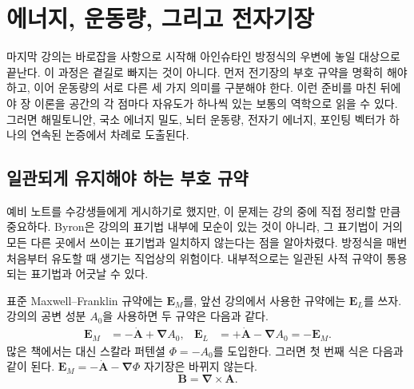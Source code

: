 \chapter{에너지, 운동량, 그리고 전자기장}

마지막 강의는 바로잡을 사항으로 시작해 아인슈타인 방정식의 우변에 놓일 대상으로 끝난다. 이 과정은 곁길로 빠지는 것이 아니다. 먼저 전기장의 부호 규약을 명확히 해야 하고, 이어 운동량의 서로 다른 세 가지 의미를 구분해야 한다. 이런 준비를 마친 뒤에야 장 이론을 공간의 각 점마다 자유도가 하나씩 있는 보통의 역학으로 읽을 수 있다. 그러면 해밀토니안, 국소 에너지 밀도, 뇌터 운동량, 전자기 에너지, 포인팅 벡터가 하나의 연속된 논증에서 차례로 도출된다.

\section{일관되게 유지해야 하는 부호 규약}

예비 노트를 수강생들에게 게시하기로 했지만, 이 문제는 강의 중에 직접 정리할 만큼 중요하다. Byron은 강의의 표기법 내부에 모순이 있는 것이 아니라, 그 표기법이 거의 모든 다른 곳에서 쓰이는 표기법과 일치하지 않는다는 점을 알아차렸다. 방정식을 매번 처음부터 유도할 때 생기는 직업상의 위험이다. 내부적으로는 일관된 사적 규약이 통용되는 표기법과 어긋날 수 있다.

표준 Maxwell--Franklin 규약에는 \(\mathbf E_M\)를, 앞선 강의에서 사용한 규약에는 \(\mathbf E_L\)를 쓰자. 강의의 공변 성분 \(A_0\)을 사용하면 두 규약은 다음과 같다.
\begin{align}
\mathbf E_M
  &= -\dot{\mathbf A}+\boldsymbol{\nabla}A_0,
&
\mathbf E_L
  &= +\dot{\mathbf A}-\boldsymbol{\nabla}A_0
   =-\mathbf E_M .
\label{eq:two-electric-conventions}
\end{align}많은 책에서는 대신 스칼라 퍼텐셜 \(\Phi=-A_0\)를 도입한다. 그러면 첫 번째 식은 다음과 같이 된다.
\(\mathbf E_M=-\dot{\mathbf A}-\boldsymbol{\nabla}\Phi\)
자기장은 바뀌지 않는다.
\begin{equation}
\mathbf B=\boldsymbol{\nabla}\times\mathbf A.
\label{eq:B-from-A-opening}
\end{equation}

